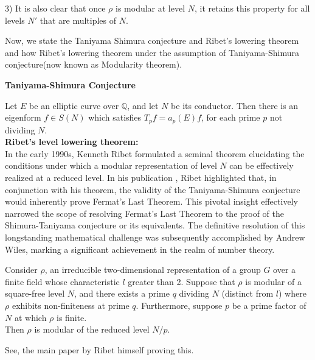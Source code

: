 \begin{proposition}
\begin{proposition}
\begin{remark}
3)
 It is also clear that once \( \rho \) is modular at level \( N \), it retains this property for all levels \( N' \) that are multiples of \( N \).
\end{remark}
Now, we state the Taniyama Shimura conjecture and Ribet's lowering theorem and how Ribet's lowering theorem under the assumption of Taniyama-Shimura conjecture(now known as Modularity theorem).

\textbf{Taniyama-Shimura Conjecture}

Let $E$ be an elliptic curve over $\mathbb{Q}$, and let $N$ be its conductor. Then there is an eigenform $f \in S(N)$ which satisfies $T_p f= a_p(E)f$, for each prime $p$ not dividing $N$. \\

\textbf{Ribet's level lowering theorem:}\\
In the early 1990s, Kenneth Ribet formulated a seminal theorem elucidating the conditions under which a modular representation of level \( N \) can be effectively realized at a reduced level. In his publication \cite{ribet1990from}, Ribet highlighted that, in conjunction with his theorem, the validity of the Taniyama-Shimura conjecture would inherently prove Fermat's Last Theorem. This pivotal insight effectively narrowed the scope of resolving Fermat's Last Theorem to the proof of the Shimura-Taniyama conjecture or its equivalents. The definitive resolution of this longstanding mathematical challenge was subsequently accomplished by Andrew Wiles, marking a significant achievement in the realm of number theory. 

\begin{theorem}
Consider \( \rho \), an irreducible two-dimensional representation of a group \( G \) over a finite field whose characteristic \( l \) greater than 2. Suppose that \( \rho \) is modular of  a square-free level \( N \), and there exists a prime \( q \) dividing \( N \) (distinct from \( l \)) where \( \rho \) exhibits non-finiteness at prime $q$. Furthermore,  suppose \( p \) be a prime factor of \( N \) at which \( \rho \) is finite. \\
Then \( \rho \) is modular of the reduced level \( N / p \).
\end{theorem}

\begin{theorem}
  See, the main paper \cite{ribet1990from} by Ribet himself proving this. 
\end{theorem}
\end{proposition}
\end{proposition}

